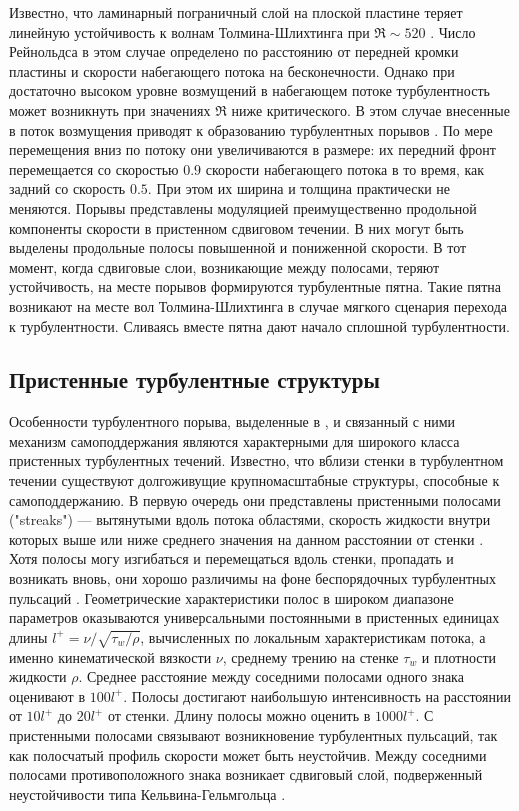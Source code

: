 Известно, что ламинарный пограничный слой на плоской пластине теряет линейную устойчивость к волнам Толмина-Шлихтинга при $\Re \sim 520$ \cite{Schlichting2004}. Число Рейнольдса в этом случае определено по расстоянию от передней кромки пластины и скорости набегающего потока на бесконечности. Однако при достаточно высоком уровне возмущений в набегающем потоке турбулентность может возникнуть при значениях $\Re$ ниже критического. В этом случае внесенные в поток возмущения приводят к образованию турбулентных порывов \cite{Katasonov2014}. По мере перемещения вниз по потоку они увеличиваются в размере: их передний фронт перемещается со скоростью $0.9$ скорости набегающего потока в то время, как задний со скорость $0.5$. При этом их ширина и толщина практически не меняются. Порывы представлены модуляцией преимущественно продольной компоненты скорости в пристенном сдвиговом течении. В них могут быть выделены продольные полосы повышенной и пониженной скорости. В тот момент, когда сдвиговые слои, возникающие между полосами, теряют устойчивость, на месте порывов формируются турбулентные пятна. Такие пятна возникают на месте вол Толмина-Шлихтинга в случае мягкого сценария перехода к турбулентности. Сливаясь вместе пятна дают начало сплошной турбулентности. 


	\subsection{Пристенные турбулентные структуры} \label{structure_subsection}

Особенности турбулентного порыва, выделенные в \cite{Shimizu2009}, и связанный с ними механизм самоподдержания являются характерными для широкого класса пристенных турбулентных течений. Известно, что вблизи стенки в турбулентном течении существуют долгоживущие крупномасштабные структуры, способные к самоподдержанию. В первую очередь они представлены пристенными полосами ("streaks") --- вытянутыми вдоль потока областями, скорость жидкости внутри которых выше или ниже среднего значения на данном расстоянии от стенки \cite{Klebanoff1962}. Хотя полосы могу изгибаться и перемещаться вдоль стенки, пропадать и возникать вновь, они хорошо различимы на фоне беспорядочных турбулентных пульсаций \cite{Kline1967}. Геометрические характеристики полос в широком диапазоне параметров оказываются универсальными постоянными в пристенных единицах длины $l^+ = \nu / \sqrt{\tau_{w} / \rho}$, вычисленных по локальным характеристикам потока, а именно кинематической вязкости $\nu$, среднему трению на стенке $\tau_{w}$ и плотности жидкости $\rho$. Среднее расстояние между соседними полосами одного знака оценивают в $100 l^+$. Полосы достигают наибольшую интенсивность на расстоянии от $10 l^+$ до $20 l^+$ от стенки. Длину полосы можно оценить в $1000 l^+$. С пристенными полосами связывают возникновение турбулентных пульсаций, так как полосчатый профиль скорости может быть неустойчив. Между соседними полосами противоположного знака возникает сдвиговый слой, подверженный неустойчивости типа Кельвина-Гельмгольца \cite{}.

